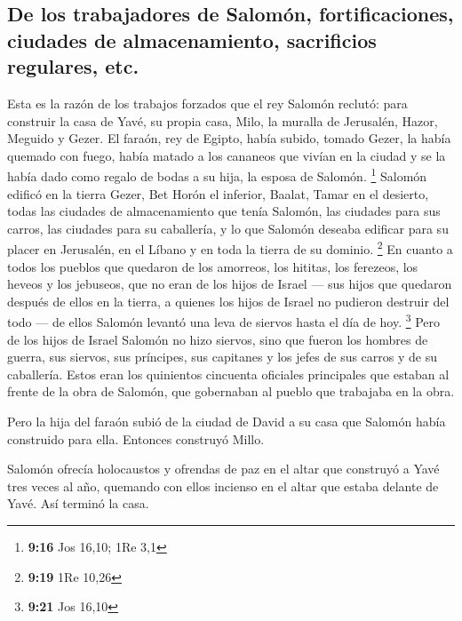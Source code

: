 \begin{paracol}{2}
\hypertarget{de-los-trabajadores-de-salomuxf3n-fortificaciones-ciudades-de-almacenamiento-sacrificios-regulares-etc.}{%
\subsection{De los trabajadores de Salomón, fortificaciones, ciudades de
almacenamiento, sacrificios regulares,
etc.}\label{de-los-trabajadores-de-salomuxf3n-fortificaciones-ciudades-de-almacenamiento-sacrificios-regulares-etc.}}

 Esta es la razón de los trabajos forzados que el rey
Salomón reclutó: para construir la casa de Yavé, su propia casa, Milo,
la muralla de Jerusalén, Hazor, Meguido y Gezer.  El
faraón, rey de Egipto, había subido, tomado Gezer, la había quemado con
fuego, había matado a los cananeos que vivían en la ciudad y se la había
dado como regalo de bodas a su hija, la esposa de Salomón. \footnote{\textbf{9:16}
  Jos 16,10; 1Re 3,1}  Salomón edificó en la tierra
Gezer, Bet Horón el inferior,  Baalat, Tamar en el
desierto,  todas las ciudades de almacenamiento que tenía
Salomón, las ciudades para sus carros, las ciudades para su caballería,
y lo que Salomón deseaba edificar para su placer en Jerusalén, en el
Líbano y en toda la tierra de su dominio. \footnote{\textbf{9:19} 1Re
  10,26}  En cuanto a todos los pueblos que quedaron de
los amorreos, los hititas, los ferezeos, los heveos y los jebuseos, que
no eran de los hijos de Israel ---  sus hijos que
quedaron después de ellos en la tierra, a quienes los hijos de Israel no
pudieron destruir del todo --- de ellos Salomón levantó una leva de
siervos hasta el día de hoy. \footnote{\textbf{9:21} Jos 16,10}
 Pero de los hijos de Israel Salomón no hizo siervos,
sino que fueron los hombres de guerra, sus siervos, sus príncipes, sus
capitanes y los jefes de sus carros y de su caballería. 
Estos eran los quinientos cincuenta oficiales principales que estaban al
frente de la obra de Salomón, que gobernaban al pueblo que trabajaba en
la obra.

 Pero la hija del faraón subió de la ciudad de David a su
casa que Salomón había construido para ella. Entonces construyó Millo.

 Salomón ofrecía holocaustos y ofrendas de paz en el
altar que construyó a Yavé tres veces al año, quemando con ellos
incienso en el altar que estaba delante de Yavé. Así terminó la casa.


\end{paracol}
